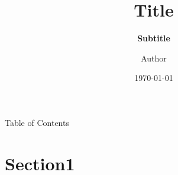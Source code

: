 \documentclass[9pt,aspectratio=43,mathserif,table]{beamer}
\title{\fontsize{14pt}{14pt} Title}
\subtitle{\fontsize{11pt}{14pt}\textbf{Subtitle}}
\author{\fontsize{8pt}{14pt}Author}
\institute{\fontsize{8pt}{14pt} Computer Science Institute}
\date{\today}
\begin{document}

\frame{\titlepage}

\section[Table of Contents]{}   %
\begin{frame}{Table of Contents}\small
  \begin{spacing}{0.5}
    \tableofcontents
  \end{spacing}
\end{frame}

\section{Section1}  %
\end{document}
